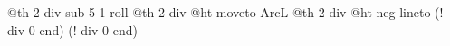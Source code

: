 {{             @th 2 div sub 5 1 roll
             @th 2 div @ht moveto ArcL
             @th 2 div @ht neg lineto
          }%
       \fi
    \fi
    \ifdim\POK@lens@radiusRight pt=0pt\else
       \ifdim\POK@lens@radiusLeft pt=0pt\else
          \addto@pscode{%
             @th 2 div dup
             7 1 roll sub neg 5 1 roll
             ArcR sub 5 1 roll ArcL
          }%
       \fi
    \fi
    \pnode(! \pst@optexpdict\space\@lens@th{} div 0 end){\optexp@nodeIn}
    \pnode(! \pst@optexpdict\space\@lens@th{} div 0 end){\optexp@nodeOut}
    \end@ClosedObj
    \else
       \pst@draw@lens
   \fi
\ignorespaces}%
%
%
%
